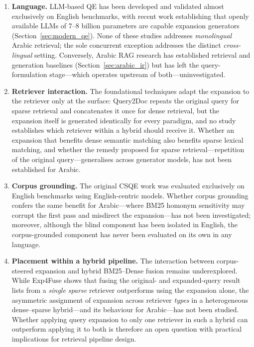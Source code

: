 \begin{enumerate}
    \item \textbf{Language.} LLM-based QE has been developed and validated almost exclusively on English benchmarks, with recent work establishing that openly available LLMs of 7--8 billion parameters are capable expansion generators (Section~\ref{sec:modern_qe}). None of these studies addresses \textit{monolingual} Arabic retrieval; the sole concurrent exception \cite{macmillanscott_2025_generative} addresses the distinct \textit{cross-lingual} setting. Conversely, Arabic RAG research has established retrieval and generation baselines (Section~\ref{sec:arabic_ir}) but has left the query-formulation stage---which operates upstream of both---uninvestigated.

    \item \textbf{Retriever interaction.} The foundational techniques adapt the expansion to the retriever only at the surface: Query2Doc repeats the original query for sparse retrieval and concatenates it once for dense retrieval, but the expansion itself is generated identically for every paradigm, and no study establishes which retriever within a hybrid should receive it. Whether an expansion that benefits dense semantic matching also benefits sparse lexical matching, and whether the remedy proposed for sparse retrieval---repetition of the original query---generalises across generator models, has not been established for Arabic.

    \item \textbf{Corpus grounding.} The original CSQE work \cite{lei_2024_csqe} was evaluated exclusively on English benchmarks using English-centric models. Whether corpus grounding confers the same benefit for Arabic---where BM25 homonym sensitivity may corrupt the first pass and misdirect the expansion---has not been investigated; moreover, although the blind component has been isolated in English, the corpus-grounded component has never been evaluated on its own in any language.

    \item \textbf{Placement within a hybrid pipeline.} The interaction between corpus-steered expansion and hybrid BM25--Dense fusion remains underexplored. While Exp4Fuse \cite{liu_2025_exp4fuse} shows that fusing the original- and expanded-query result lists from a \textit{single sparse} retriever outperforms using the expansion alone, the asymmetric assignment of expansion across retriever \textit{types} in a heterogeneous dense--sparse hybrid---and its behaviour for Arabic---has not been studied. Whether applying query expansion to only one retriever in such a hybrid can outperform applying it to both is therefore an open question with practical implications for retrieval pipeline design.
\end{enumerate}

